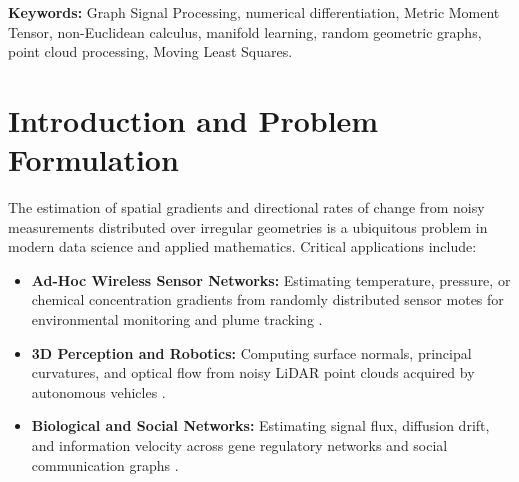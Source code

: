 \documentclass[11pt,a4paper]{article}
\theoremstyle{definition}
\begin{document}
\noindent\textbf{Keywords:} Graph Signal Processing, numerical differentiation, Metric Moment Tensor, non-Euclidean calculus, manifold learning, random geometric graphs, point cloud processing, Moving Least Squares.

\tableofcontents
\newpage


\section{Introduction and Problem Formulation}
\label{sec:intro}

The estimation of spatial gradients and directional rates of change from noisy measurements distributed over irregular geometries is a ubiquitous problem in modern data science and applied mathematics. Critical applications include:
\begin{itemize}
    \item \textbf{Ad-Hoc Wireless Sensor Networks:} Estimating temperature, pressure, or chemical concentration gradients from randomly distributed sensor motes for environmental monitoring and plume tracking \cite{shuman2013, ortega2018}.
    \item \textbf{3D Perception and Robotics:} Computing surface normals, principal curvatures, and optical flow from noisy LiDAR point clouds acquired by autonomous vehicles \cite{levin1998, alexa2003}.
    \item \textbf{Biological and Social Networks:} Estimating signal flux, diffusion drift, and information velocity across gene regulatory networks and social communication graphs \cite{belkin2003, coifman2006}.
\end{itemize}
\end{document}
